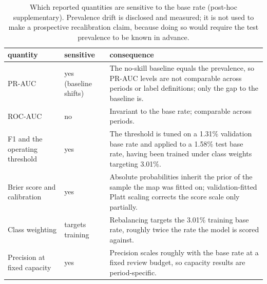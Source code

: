 \begin{table}[htbp]
\centering
\caption{Which reported quantities are sensitive to the base rate (post-hoc supplementary). Prevalence drift is disclosed and measured; it is not used to make a prospective recalibration claim, because doing so would require the test prevalence to be known in advance.}
\label{tab:supp_prevalence_sensitivity}
\small
\begin{tabular}{p{}p{}p{}}
\toprule
quantity & sensitive & consequence \\
\midrule
PR-AUC & yes (baseline shifts) & The no-skill baseline equals the prevalence, so PR-AUC levels are not comparable across periods or label definitions; only the gap to the baseline is. \\
ROC-AUC & no & Invariant to the base rate; comparable across periods. \\
F1 and the operating threshold & yes & The threshold is tuned on a 1.31\% validation base rate and applied to a 1.58\% test base rate, having been trained under class weights targeting 3.01\%. \\
Brier score and calibration & yes & Absolute probabilities inherit the prior of the sample the map was fitted on; validation-fitted Platt scaling corrects the score scale only partially. \\
Class weighting & targets training & Rebalancing targets the 3.01\% training base rate, roughly twice the rate the model is scored against. \\
Precision at fixed capacity & yes & Precision scales roughly with the base rate at a fixed review budget, so capacity results are period-specific. \\
\bottomrule
\end{tabular}
\end{table}
